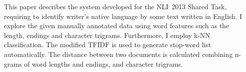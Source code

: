 This paper describes the system developed for the NLI~2013 Shared Task, requiring to identify writer's native language by some text written in English.
 I explore the given manually annotated data using word features such as the
 length, endings and character trigrams. Furthermore, I employ k-NN 
 classification. The modified TFIDF is used to generate stop-word list
 automatically. The distance between two documents is calculated combining
 n-grams of word lengths and endings, and character trigrams.

